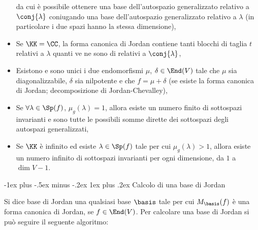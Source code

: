 \documentclass[10pt,landscape]{article}
\makeatletter
\renewcommand{\subsubsection}{\@startsection{subsubsection}{3}{0mm}%
	{-1ex plus -.5ex minus -.2ex}%
	{1ex plus .2ex}%
	{\normalfont\small\bfseries}}
\makeatother
\begin{document}
\begin{multicols}{3}
\begin{itemize}
			da cui è possibile ottenere una base dell'autospazio generalizzato relativo
			a $\conj{\lambda}$ coniugando una base dell'autospazio generalizzato relativo
			a $\lambda$ (in particolare i due spazi hanno la stessa dimensione),
			\item Se $\KK=\CC$, la forma canonica di Jordan contiene tanti blocchi di taglia $t$
			relativi a $\lambda$ quanti ve ne sono di relativi a $\conj{\lambda}$,
			\item Esistono e sono unici i due endomorfismi $\mu$, $\delta \in \End(V)$
			tale che $\mu$ sia diagonalizzabile, $\delta$ sia nilpotente e che
			$f = \mu + \delta$ (se esiste la forma canonica di Jordan; decomposizione di
			Jordan-Chevalley),
			\item Se $\forall \lambda \in \Sp(f)$, $\mu_g(\lambda) = 1$, allora
			esiste un numero finito di sottospazi invarianti e sono tutte le possibili
			somme dirette dei sottospazi degli autospazi generalizzati, %
			\item Se $\KK$ è infinito ed esiste $\lambda \in \Sp(f)$ tale per cui
			$\mu_g(\lambda) > 1$, allora esiste un numero infinito di sottospazi invarianti
			per ogni dimensione, da $1$ a $\dim V -1$. %
		\end{itemize}
		
		\subsubsection{Calcolo di una base di Jordan}
		
		Si dice base di Jordan una qualsiasi base $\basis$ tale per cui
		$M_\basis(f)$ è una forma canonica di Jordan, se $f \in \End(V)$.
		Per calcolare una base di Jordan si può seguire il seguente
		algoritmo:
		

\end{multicols}
\end{document}
